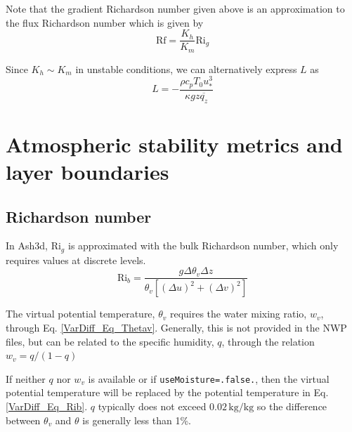 Note that the gradient Richardson number given above is an approximation to the flux
Richardson number which is given by
\begin{equation}\label{VarDiff_Eq_Rf}
\mathrm{Rf} = \frac{K_h}{K_m}\mathrm{Ri}_g
\end{equation}

Since $K_h \sim K_m$ in unstable conditions, we can alternatively express $L$ as
\begin{equation}\label{VarDiff_Eq_Lalt}
L = -\frac{\rho c_p T_0 u^3_{*}}{\kappa g z \overline{q_z}} %
\end{equation}



\section{Atmospheric stability metrics and layer boundaries}
\subsection{Richardson number}

In Ash3d, $\mathrm{Ri}_g$ is approximated with the bulk Richardson number, which
only requires values at discrete levels.
\begin{equation}\label{VarDiff_Eq_Rib}
\mathrm{Ri}_b = \frac{g \Delta \theta_v \Delta z}
{\theta_v \left[ \left( \Delta u \right)^2 + \left( \Delta v \right)^2 \right]}
\end{equation}

The virtual potential temperature, $\theta_v$ requires the water mixing ratio, $w_v$,
through Eq. \ref{VarDiff_Eq_Thetav}. Generally, this is not provided
in the NWP files, but can be related to the specific humidity, $q$, through the relation
$w_v=q/(1-q)$

If neither $q$ nor $w_v$ is available or if \texttt{useMoisture=.false.}, then
the virtual potential temperature will be replaced by the potential temperature in Eq. \ref{VarDiff_Eq_Rib}.
$q$ typically does not exceed $0.02 \, \mathrm{kg}/\mathrm{kg}$ so the difference between $\theta_v$
and $\theta$ is generally less than 1\%.

